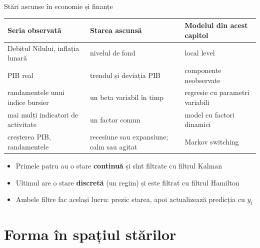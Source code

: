 \begin{frame}{Stări ascunse în economie și finanțe}
\itemsize{\small}
\begin{center}
\footnotesize
\begin{tabular}{>{\raggedright\arraybackslash}p{3.6cm}>{\raggedright\arraybackslash}p{3.6cm}>{\raggedright\arraybackslash}p{3.4cm}}
\toprule
\textbf{Seria observată} & \textbf{Starea ascunsă} & \textbf{Modelul din acest capitol} \\
\midrule
Debitul Nilului, inflația lunară & nivelul de fond & local level \\
PIB real & trendul și deviația PIB & componente neobservate \\
randamentele unui indice bursier & un beta variabil în timp & regresie cu parametri variabili \\
mai mulți indicatori de activitate & un factor comun & model cu factori dinamici \\
creșterea PIB, randamentele & recesiune sau expansiune; calm sau agitat & Markov switching \\
\bottomrule
\end{tabular}
\end{center}
\begin{itemize}
    \item Primele patru au o stare \textbf{continuă} și sînt filtrate cu filtrul Kalman
    \item Ultimul are o stare \textbf{discretă} (un regim) și este filtrat cu filtrul Hamilton
    \item Ambele filtre fac același lucru: prezic starea, apoi actualizează predicția cu $y_t$
\end{itemize}
\end{frame}


\section{Forma în spațiul stărilor}

